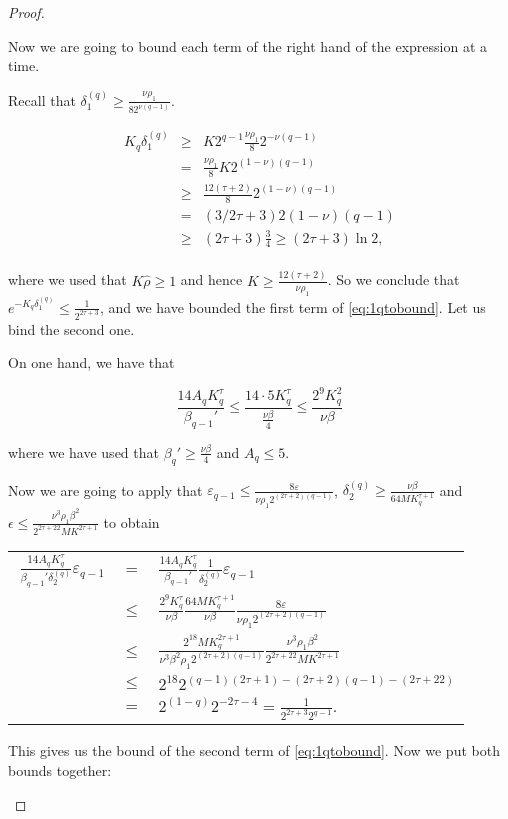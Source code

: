 \begin{proof}
\begin{enumerate}
\begin{itemize}
\begin{itemize}
Now we are going to bound each term of the right hand of the expression at a time.

Recall that $\delta_1^{(q)} \geq \frac{\nu \rho_1}{8 2^{\nu(q-1)}}$.

$$
\begin{array}{rcl}
  K_q \delta_1^{(q)} &  \geq &  K 2^{q-1} \frac{\nu \rho_1}{8} 2^{-\nu(q-1)} \\
  &  =  &  \frac{\nu \rho_1}{8}K 2^{(1-\nu)(q-1)} \\
  &  \geq &  \frac{12(\tau+2)}{8} 2^{(1-\nu)(q-1)} \\
  &  =  &  (3/2\tau + 3)2(1-\nu)(q-1) \\
  &  \geq &  (2\tau+3)\frac{3}{4} \geq (2\tau+3)\ln 2, \\
\end{array}
$$

where we used that $K\hat\rho\geq 1$ and hence $K \geq \frac{12(\tau+2)}{\nu\rho_1}$.
So we conclude that $e^{-K_q \delta_1^{(q)}} \leq \frac{1}{2^{2\tau+3}}$, and we have bounded the first term of \ref{eq:1qtobound}. Let us bind the second one.

On one hand, we have that

$$\frac{14 A_q K_q^\tau}{\beta_{q-1}'} \leq \frac{14\cdot5 K_q^\tau}{\frac{\nu \beta}{4}} \leq \frac{2^9 K_q^2}{\nu \beta} $$%

where we have used that $\beta_q'\geq \frac{\nu\beta}{4}$ and $ A_q \leq 5$.

Now we are going to apply that $\varepsilon_{q-1} \leq \frac{8 \varepsilon}{\nu \rho_1 2^{(2\tau+2)(q-1)}}$, $\delta_2^{(q)}\geq \frac{\nu \beta}{64 M K_q^{\tau+1}}$ and $\epsilon \leq \frac{\nu^3 \rho_1 \beta^2}{2^{2\tau+22} M K^{2\tau+1}}$ to obtain

\begin{longtable}{rcl}
 $\ \frac{14 A_q K_q^\tau}{\beta_{q-1}' \delta_2^{(q)}} \varepsilon_{q-1}$ & $ =$ & $ \frac{14 A_q K_q^\tau}{\beta_{q-1}'}\frac{1}{\delta_2^{(q)}}\varepsilon_{q-1}$ \\
 & $ \leq$ & $ \frac{2^9 K_q^\tau}{\nu\beta} \frac{64 M K_q^{\tau+1}}{\nu \beta}\frac{8\varepsilon}{\nu \rho_1 2^{(2\tau+2)(q-1)}}$ \\
  & $ \leq$ & $ \frac{2^{18} M K_q^{2\tau+1}}{\nu^3 \beta^2 \rho_1 2^{(2\tau+2)(q-1)}}\frac{\nu^3 \rho_1 \beta^2}{2^{2\tau+22}M K^{2\tau + 1}}$ \\
  & $ \leq$ & $ 2^{18} 2^{(q-1)(2\tau+1)-(2\tau+2)(q-1)-(2\tau+22)}$ \\
  & $ =$ & $ 2^{(1-q)}2^{-2\tau-4} = \frac{1}{2^{2\tau+3}2^{q-1}}.$ \\
\end{longtable}
This gives us the bound of the second term of \ref{eq:1qtobound}. Now we put both bounds together:


\end{itemize}
\end{itemize}
\end{enumerate}
\end{proof}
